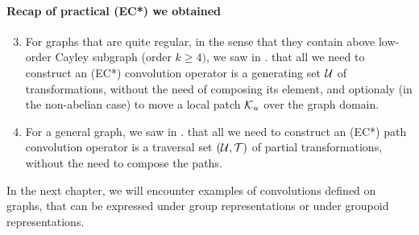 \paragraph{Recap of practical (EC*) we obtained}
\begin{enumerate}
  \setcounter{enumi}{2}
\item For graphs that are quite regular, in the sense that they contain above low-order Cayley subgraph (order $k \geq 4)$, we saw in . that all we need to construct an (EC*) convolution operator is a generating set $\mathcal{U}$ of transformations, without the need of composing its element, and optionaly (in the non-abelian case) to move a local patch $\mathcal{K}_u$ over the graph domain.
\item For a general graph, we saw in . that all we need to construct an (EC*) path convolution operator is a traversal set $(\mathcal{U}, \mathcal{T})$ of partial transformations, without the need to compose the paths.
\end{enumerate}

In the next chapter, we will encounter examples of convolutions defined on graphs, that can be expressed under group representations or under groupoid representations.
